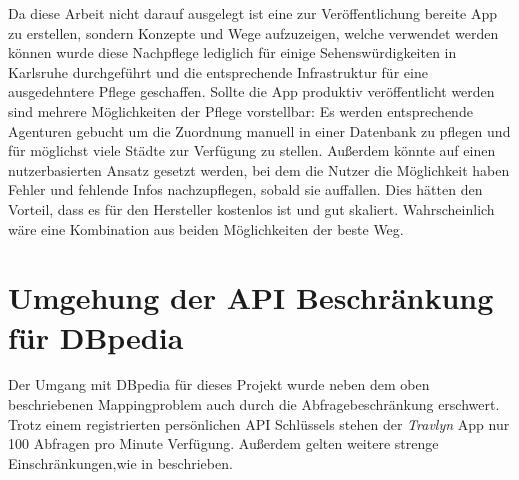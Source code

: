 	\vspace{0.25cm}
	
	Da diese Arbeit nicht darauf ausgelegt ist eine zur Veröffentlichung bereite App zu erstellen, sondern Konzepte und Wege aufzuzeigen, welche verwendet werden können wurde diese Nachpflege lediglich für einige Sehenswürdigkeiten in Karlsruhe durchgeführt und die entsprechende Infrastruktur für eine ausgedehntere Pflege geschaffen. Sollte die App produktiv veröffentlicht werden sind mehrere Möglichkeiten der Pflege vorstellbar: Es werden entsprechende Agenturen gebucht um die Zuordnung manuell in einer Datenbank zu pflegen und für möglichst viele Städte zur Verfügung zu stellen. Außerdem könnte auf einen nutzerbasierten Ansatz gesetzt werden, bei dem die Nutzer die Möglichkeit haben Fehler und fehlende Infos nachzupflegen, sobald sie auffallen. Dies hätten den Vorteil, dass es für den Hersteller kostenlos ist und gut skaliert. Wahrscheinlich wäre eine Kombination aus beiden Möglichkeiten der beste Weg.
	
	\section{Umgehung der API Beschränkung für DBpedia}
	
	Der Umgang mit DBpedia für dieses Projekt wurde neben dem oben beschriebenen Mappingproblem auch durch die Abfragebeschränkung erschwert. Trotz einem registrierten persönlichen \acs{API} Schlüssels stehen der \textit{Travlyn} App nur 100 Abfragen pro Minute Verfügung. Außerdem gelten weitere strenge Einschränkungen,wie in \cite{DBpedia.2020} beschrieben. 
	
	\vspace{0.25cm}
	
